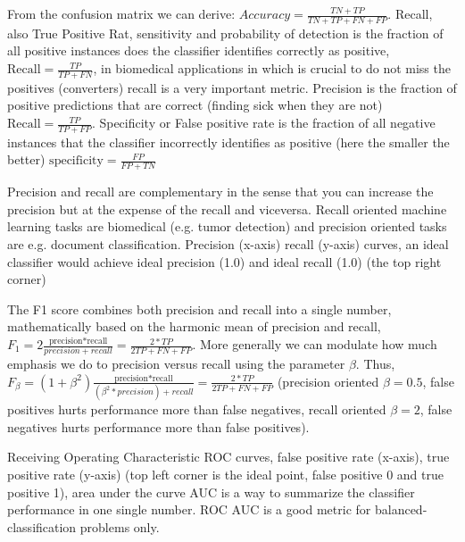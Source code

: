 \documentclass[11pt]{article}
\begin{document}
From the confusion matrix we can derive:
$\textit{Accuracy} = \frac{TN + TP}{TN+TP+FN+FP}$. 
Recall, also True Positive Rat, sensitivity and probability of detection  is the fraction of all positive instances does the classifier identifies correctly as positive, $\text{Recall} = \frac{TP}{TP+FN}$, in biomedical applications in which is crucial to do not miss the positives (converters) recall is a very important metric.
Precision is the fraction of positive predictions that are correct (finding sick when they are not) $\text{Recall} = \frac{TP}{TP+FP}$.
Specificity or False positive rate is the fraction of all negative instances that the classifier incorrectly identifies as positive (here the smaller the better)  $\text{specificity} = \frac{FP}{FP+TN}$

Precision and recall are complementary in the sense that you can increase the precision but at the expense of the recall and viceversa. Recall oriented machine learning tasks are biomedical (e.g. tumor detection) and precision oriented tasks are e.g. document classification. Precision (x-axis) recall (y-axis) curves, an ideal classifier would achieve ideal precision (1.0) and ideal recall (1.0) (the top right corner) 

The F1 score combines both precision and recall into a single number, mathematically based on the harmonic mean of precision and recall, $F_1 = 2\frac{\text{precision*recall}}{precision+recall} = \frac{2 * TP}{2TP + FN + FP}$. More generally we can modulate how much emphasis we do to precision versus recall using the parameter $\beta$. Thus, $F_\beta = (1+\beta^2)\frac{\text{precision*recall}}{(\beta^2 * precision)+recall} = \frac{2 * TP}{2TP + FN + FP}$ (precision oriented $\beta=0.5$, false positives hurts performance more than false negatives, recall oriented $\beta=2$, false negatives hurts performance more than false positives).

Receiving Operating Characteristic ROC curves, false positive rate (x-axis), true positive rate (y-axis) (top left corner is the ideal point, false positive 0 and true positive 1), area under the curve AUC is a way to summarize the classifier performance in one single number. ROC AUC is a good metric for balanced-classification problems only.
\end{document}

